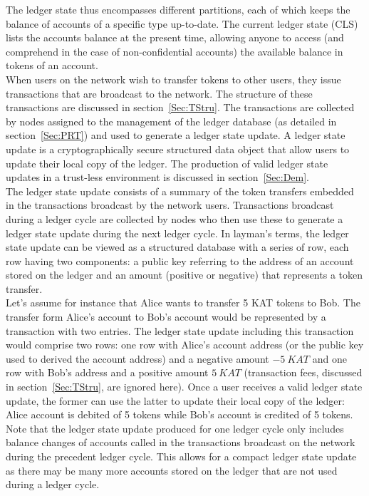 The ledger state thus encompasses different partitions, each of which keeps the balance of accounts of a specific type up-to-date. The current ledger state (CLS) lists the accounts balance at the present time, allowing anyone to access (and comprehend in the case of non-confidential accounts) the available balance in tokens of an account. \\

When users on the network wish to transfer tokens to other users, they issue transactions that are broadcast to the network. The structure of these transactions are discussed in section~\ref{Sec:TStru}. The transactions are collected by nodes assigned to the management of the ledger database (as detailed in section~\ref{Sec:PRT}) and used to generate a ledger state update. A ledger state update is a cryptographically secure structured data object that allow users to update their local copy of the ledger. The production of valid ledger state updates in a trust-less environment is discussed in section~\ref{Sec:Dem}. \\

The ledger state update consists of a summary of the token transfers embedded in the transactions broadcast by the network users. Transactions broadcast during a ledger cycle are collected by nodes who then use these to generate a ledger state update during the next ledger cycle. In layman's terms, the ledger state update can be viewed as a structured database with a series of row, each row having two components: a public key referring to the address of an account stored on the ledger and an amount (positive or negative) that represents a token transfer.\\ 

Let's assume for instance that Alice wants to transfer 5 KAT tokens to Bob. The transfer form Alice's account to Bob's account would be represented by a transaction with two entries. The ledger state update including this transaction would comprise two rows: one row with Alice's account address (or the public key used to derived the account address) and a negative amount $-5~KAT$ and one row with Bob's address and a positive amount $5~KAT$ (transaction fees, discussed in section~\ref{Sec:TStru}, are ignored here). Once a user receives a valid ledger state update, the former can use the latter to update their local copy of the ledger: Alice account is debited of 5 tokens while Bob's account is credited of 5 tokens. Note that the ledger state update produced for one ledger cycle only includes balance changes of accounts called in the transactions broadcast on the network during the precedent ledger cycle. This allows for a compact ledger state update as there may be many more accounts stored on the ledger that are not used during a ledger cycle.\\

